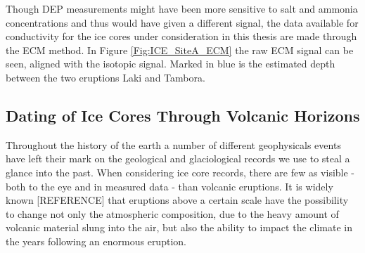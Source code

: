 \documentclass[../../CompleteThesis2/Complete_2ndDraft]{subfiles}
\begin{document}
Though DEP measurements might have been more sensitive to salt and ammonia concentrations and thus would have given a different signal, the data available for conductivity for the ice cores under consideration in this thesis are made through the ECM method. In Figure \ref{Fig:ICE_SiteA_ECM} the raw ECM signal can be seen, aligned with the isotopic signal. Marked in blue is the estimated depth between the two eruptions Laki and Tambora.



\subsection[Volcanic Horizons][Volcanic Horizons]{Dating of Ice Cores Through Volcanic Horizons}
\label{Subsec:Ice_ECMandDEP_VolcanicHorizons}


Throughout the history of the earth a number of different geophysicals events have left their mark on the geological and glaciological records we use to steal a glance into the past. When considering ice core records, there are few as visible - both to the eye and in measured data - than volcanic eruptions. It is widely known [REFERENCE] that eruptions above a certain scale have the possibility to change not only the atmospheric composition, due to the heavy amount of volcanic material slung into the air, but also the ability to impact the climate in the years following an enormous eruption. 
\end{document}
